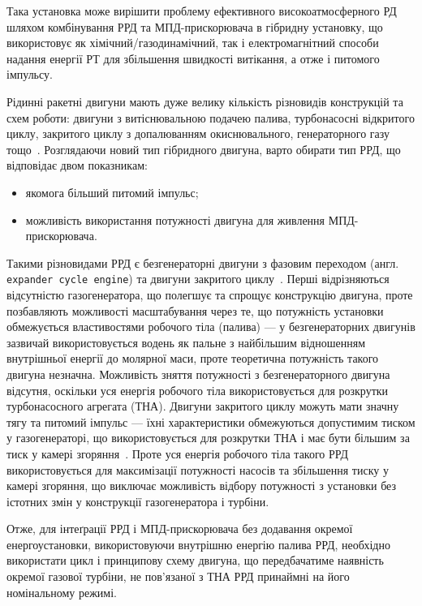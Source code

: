 Така установка може вирішити проблему ефективного високоатмосферного РД шляхом комбінування РРД та МПД-прискорювача в гібридну установку, що використовує як хімічний/газодинамічний, так і електромагнітний способи надання енергії РТ для збільшення швидкості витікання, а отже і питомого імпульсу.

Рідинні ракетні двигуни мають дуже велику кількість різновидів конструкцій та схем роботи: двигуни з витіснювальною подачею палива, турбонасосні відкритого циклу, закритого циклу з допалюванням окиснювального, генераторного газу тощо~\cite{Dobrovolskiy}. Розглядаючи новий тип гібридного двигуна, варто обирати тип РРД, що відповідає двом показникам: 
\begin{itemize}
	\item якомога більший питомий імпульс;
	\item можливість використання потужності двигуна для живлення МПД-прискорювача.
\end{itemize}


Такими різновидами РРД є безгенераторні двигуни з фазовим переходом (англ. \texttt{expander cycle engine}) та двигуни закритого циклу~\cite{Sutton}. Перші відрізняються відсутністю газогенератора, що полегшує та спрощує конструкцію двигуна, проте позбавляють можливості масштабування через те, що потужність установки обмежується властивостями робочого тіла (палива) --- у безгенераторних двигунів зазвичай використовується водень як пальне з найбільшим відношенням внутрішньої енергії до молярної маси, проте теоретична потужність такого двигуна незначна. Можливість зняття потужності з безгенераторного двигуна відсутня, оскільки уся енергія робочого тіла використовується для розкрутки турбонасосного агрегата (ТНА). 
Двигуни закритого циклу можуть мати значну тягу та питомий імпульс --- їхні характеристики обмежуються допустимим тиском у газогенераторі, що використовується для розкрутки ТНА і має бути більшим за тиск у камері згоряння~\cite{Ovsyannikov}. Проте уся енергія робочого тіла такого РРД використовується для максимізації потужності насосів та збільшення тиску у камері згоряння, що виключає можливість відбору потужності з установки без істотних змін у конструкції газогенератора і турбіни.

Отже, для інтеґрації РРД і МПД-прискорювача без додавання окремої енергоустановки, використовуючи внутрішню енергію палива РРД, необхідно використати цикл і принципову схему двигуна, що передбачатиме наявність окремої газової турбіни, не пов'язаної з ТНА РРД принаймні на його номінальному режимі.

